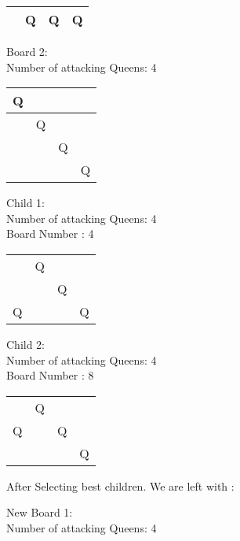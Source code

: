 \documentclass[a4paper,10pt]{article}
\begin{document}
\begin{flushleft}
\begin{flushleft}
\begin{flushleft}
\begin{flushleft}
\begin{flushleft}
\begin{flushleft}
\begin{flushleft}
\begin{flushleft}
\begin{tabular}{| l | l | l | l |}
     & Q & Q & Q \\ \hline
    \end{tabular}
\begin{flushleft}
Board 2:\\
Number of attacking Queens: 4 \\
\vspace{5mm}
    \begin{tabular}{| l | l | l | l |}
    \hline
     Q & & & \\ \hline
     & Q & & \\ \hline
     & & Q & \\ \hline
     & & & Q \\ \hline
    \end{tabular}
\begin{flushleft}
Child 1: \\
Number of attacking Queens: 4 \\
Board Number : 4\\
\vspace{5mm}
    \begin{tabular}{| l | l | l | l |}
    \hline
     & & & \\ \hline
     & Q & & \\ \hline
     & & Q & \\ \hline
     Q & & & Q \\ \hline
    \end{tabular}
\begin{flushleft}
Child 2: \\
Number of attacking Queens: 4\\
Board Number :  8\\
\vspace{5mm}
    \begin{tabular}{| l | l | l | l |}
    \hline
     & & & \\ \hline
     & Q & & \\ \hline
     Q & & Q & \\ \hline
     & & & Q \\ \hline
    \end{tabular}
\break
\break
After Selecting best children. We are left with :
\break
\begin{flushleft}
New Board 1: \\
Number of attacking Queens: 4 \\
\vspace{5mm}


\end{flushleft}
\end{flushleft}
\end{flushleft}
\end{flushleft}
\end{flushleft}
\end{flushleft}
\end{flushleft}
\end{flushleft}
\end{flushleft}
\end{flushleft}
\end{flushleft}
\end{flushleft}
\end{document}
